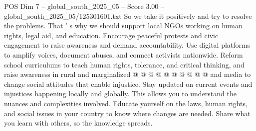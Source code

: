 \begin{textsample}{POS Dim 7 – global\_south\_2025\_05 – Score 3.00 – global\_south\_2025\_05/125301601.txt}
So we take it positively and try to resolve the problems.
That ' s why we should support local NGOs working on human rights, legal aid, and education.
Encourage peaceful protests and civic engagement to raise awareness and demand accountability.
Use digital platforms to amplify voices, document abuses, and connect activists nationwide.
Reform school curriculums to teach human rights, tolerance, and critical thinking, and raise awareness in rural and marginalized @ @ @ @ @ @ @ @ @ @ and media to change social attitudes that enable injustice.
Stay updated on current events and injustices happening locally and globally.
This allows you to understand the nuances and complexities involved.
Educate yourself on the laws, human rights, and social issues in your country to know where changes are needed.
Share what you learn with others, so the knowledge spreads.

\end{textsample}
